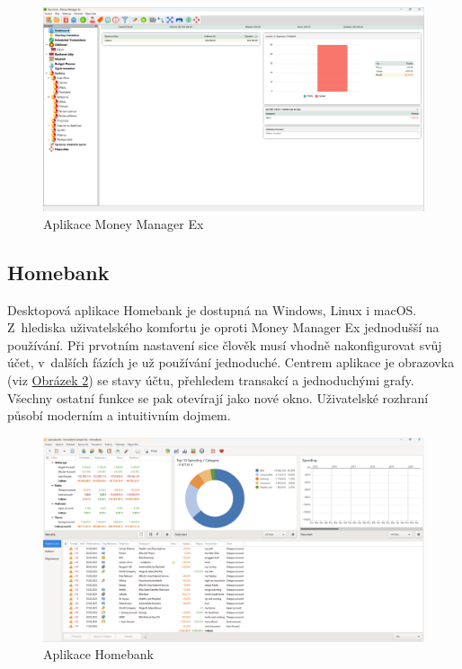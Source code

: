 \documentclass[
  biblatex,
  figures=true,
  tables=false,
  glossaries,
  index
]{kidiplom}
\begin{document}
\begin{figure}
  \centering
  \includegraphics[width=1\textwidth]{images/manager-ex.png}
  \caption{Aplikace Money Manager Ex}
  \label{fig:money-manager}
\end{figure}

\subsection{Homebank}
Desktopová aplikace Homebank \cite{homebank} je dostupná na Windows, Linux i macOS. Z~hlediska uživatelského komfortu je oproti Money Manager Ex jednodušší na používání. Při prvotním nastavení sice člověk musí vhodně nakonfigurovat svůj účet, v~dalších fázích je už používání jednoduché. Centrem aplikace je obrazovka (viz \hyperref[fig:homebank]{Obrázek \ref{fig:homebank}}) se stavy účtu, přehledem transakcí a jednoduchými grafy. Všechny ostatní funkce se pak otevírají jako nové okno. Uživatelské rozhraní působí moderním a intuitivním dojmem.

\begin{figure}
  \centering
  \includegraphics[width=1\textwidth]{images/homebank.png}
  \caption{Aplikace Homebank}
  \label{fig:homebank}
\end{figure}
\end{document}
